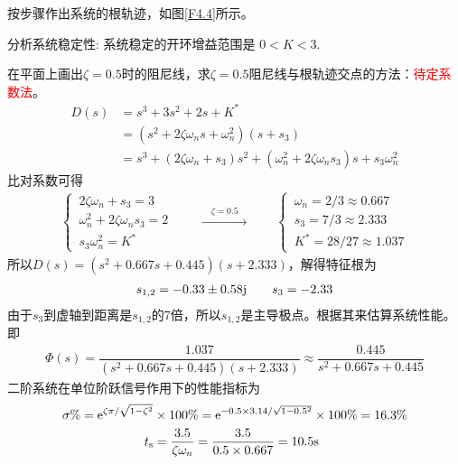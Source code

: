 按步骤作出系统的根轨迹，如图\ref{F4.4}所示。

分析系统稳定性: 系统稳定的开环增益范围是 $0<K<3$.
	
在平面上画出$\zeta =0.5$时的阻尼线，求$\zeta = 0.5$阻尼线与根轨迹交点的方法：\textcolor{red}{待定系数法}。
\begin{align*}
	D(s) &= s^3 + 3 s^2 + 2s + K^*\\
	& = \left(s^2 + 2 \zeta \omega_ns + \omega_n^2 \right)(s + s_3)\\
	& = s^3 + (2 \zeta \omega_n + s_3)s^2 +(\omega_n^2 + 2\zeta \omega_ns_3)s + s_3\omega_n^2
\end{align*}
比对系数可得
\begin{align*}
	\begin{cases}
		\, 2 \zeta \omega_n + s_3 = 3\\
		\, \omega_n^2 + 2\zeta \omega_ns_3 = 2 \\
		\, s_3\omega_n^2 = K^*
	\end{cases}
\quad \quad 
\xrightarrow{\quad \textstyle \zeta = 0.5 \quad }
\quad \quad 
	\begin{cases}
		\, \omega_n = 2/3 \approx 0.667\\
		\, s_3 = 7/3 \approx 2.333\\
		\, K^* = 28/27 \approx 1.037
	\end{cases}
\end{align*}
所以$D(s) = (s^2 + 0.667s + 0.445)(s + 2.333)$，解得特征根为
\begin{align*}
	s_{1,2} = -0.33 \pm 0.58 \text{j} \quad \quad s_3 = -2.33
\end{align*}
由于$s_3$到虚轴到距离是$s_{1,2}$的7倍，所以$s_{1,2}$是主导极点。根据其来估算系统性能。即
\begin{align*}
	\varPhi(s) = \dfrac{1.037}{(s^2 + 0.667s + 0.445)(s + 2.333)} \approx  \dfrac{0.445}{s^2 + 0.667s + 0.445}
\end{align*}
二阶系统在单位阶跃信号作用下的性能指标为
\begin{align*}
	\sigma \% = {\rm{e}} ^{\zeta \pi / \sqrt{1 - \zeta^2}} &\times 100 \% = {\rm{e}}^{-0.5\times 3.14/\sqrt{1 - 0.5^2}} \times 100 \% = 16.3 \% \\
	t_{\text{s}} &= \dfrac{3.5}{\zeta \omega_n} = \dfrac{3.5}{0.5 \times 0.667} = 10.5 \text{s}
\end{align*}

